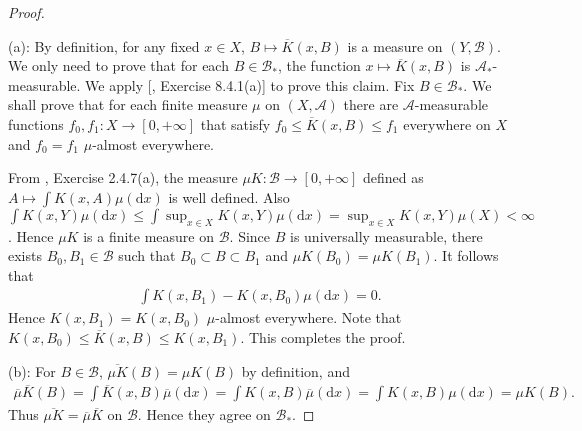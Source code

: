 \documentclass[11pt]{article}
\theoremstyle{plain}
\theoremstyle{definition}
\theoremstyle{remark}
\begin{document}
\begin{proof}
\

\noindent(a):
By definition, for any fixed $x \in X$, $B \mapsto \overline K (x,B)$ is a measure on $(Y, \mathscr B)$.
We only need to prove that for each $B \in \mathscr B_*$, the function $x\mapsto \overline K (x, B)$ is $\mathscr A_*$-measurable.
We apply [\cite{book:992991}, Exercise 8.4.1(a)] to prove this claim.
Fix $B \in \mathscr B_*$.
We shall prove that for each finite measure $\mu $ on $(X,\mathscr A)$ there are $\mathscr A$-measurable functions $f_0, f_1 : X \to [0,+\infty]$ that satisfy $f_0 \leq \overline K (x,B) \leq f_1$ everywhere on $X$ and $f_0=f_1$ $\mu$-almost everywhere.

From
\cite{book:992991}, Exercise 2.4.7(a),
the measure $\mu K : \mathscr B \to [0,+\infty]$ defined as $ A  \mapsto \int K(x, A) \mu (\mathrm d x)$ is well defined.
Also $\int K(x, Y) \mu (\mathrm d x) \leq  \int \sup_{x\in X} K(x, Y) \mu (\mathrm d x) = \sup_{x\in X} K(x, Y) \mu (X) <\infty$.
Hence $\mu K$ is a finite measure on $\mathscr B$.
Since $B$ is universally measurable, there exists $B_0, B_1 \in \mathscr B$ such that $B_0\subset B \subset B_1$ and $\mu K (B_0) = \mu K (B_1)$.
It follows that
\begin{align*}
    \int K(x, B_1 ) -  K(x, B_0 ) \mu (\mathrm d x) =0.
\end{align*} 
Hence $ K(x, B_1  ) = K(x, B_0 )$ $\mu$-almost everywhere.
Note that $K(x,B_0)  \leq \overline K (x, B) \leq K(x, B_1)$.
This completes the proof.

\noindent(b):
For $B \in \mathscr B$, $\overline{ \mu K } (B) = \mu K (B)$ by definition, and 
\begin{align*}
    \overline \mu \overline K (B) =
    \int \overline K (x,B) \overline \mu (\mathrm d x)
    =
    \int  K (x,B) \overline \mu (\mathrm d x)
    =
    \int  K (x,B)  \mu (\mathrm d x)
    =\mu K (B)
    .
\end{align*}
Thus $\overline{\mu K}= \overline \mu \overline K $ on $\mathscr B$.
Hence they agree on $\mathscr B_*$.
    
\end{proof}





\end{document}

